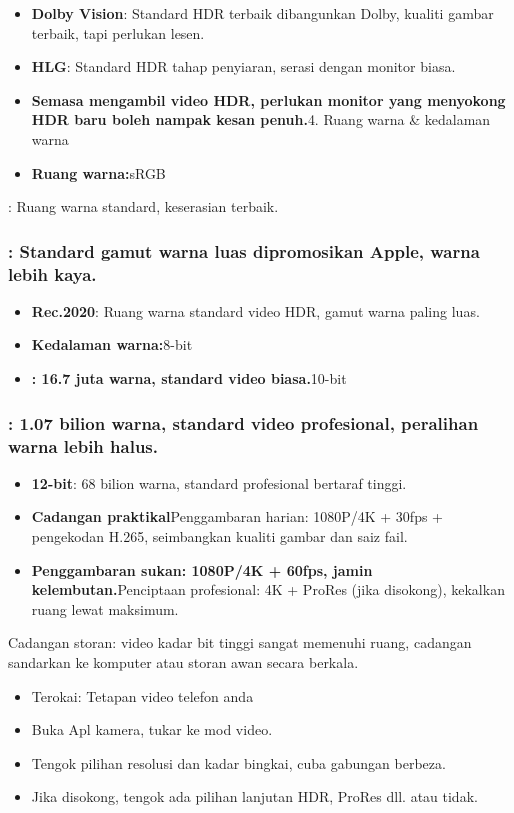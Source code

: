 \begin{itemize}
  \item \textbf{Dolby Vision}: Standard HDR terbaik dibangunkan Dolby, kualiti gambar terbaik, tapi perlukan lesen.
  \item \textbf{HLG}: Standard HDR tahap penyiaran, serasi dengan monitor biasa.
  \item \textbf{Semasa mengambil video HDR, perlukan monitor yang menyokong HDR baru boleh nampak kesan penuh.}4. Ruang warna \& kedalaman warna
  \item \textbf{Ruang warna:}sRGB
\end{itemize}

: Ruang warna standard, keserasian terbaik.


\subsubsection*{: Standard gamut warna luas dipromosikan Apple, warna lebih kaya.}

\begin{itemize}
  \item \textbf{Rec.2020}: Ruang warna standard video HDR, gamut warna paling luas.
  \item \textbf{Kedalaman warna:}8-bit
  \item \textbf{: 16.7 juta warna, standard video biasa.}10-bit
\end{itemize}

\subsubsection*{: 1.07 bilion warna, standard video profesional, peralihan warna lebih halus.}

\begin{itemize}
  \item \textbf{12-bit}: 68 bilion warna, standard profesional bertaraf tinggi.
  \item \textbf{Cadangan praktikal}Penggambaran harian: 1080P/4K + 30fps + pengekodan H.265, seimbangkan kualiti gambar dan saiz fail.
  \item \textbf{Penggambaran sukan: 1080P/4K + 60fps, jamin kelembutan.}Penciptaan profesional: 4K + ProRes (jika disokong), kekalkan ruang lewat maksimum.
\end{itemize}

\begin{tcbinfo}{Cadangan storan: video kadar bit tinggi sangat memenuhi ruang, cadangan sandarkan ke komputer atau storan awan secara berkala.}
\begin{itemize}
  \item Terokai: Tetapan video telefon anda
  \item Buka Apl kamera, tukar ke mod video.
  \item Tengok pilihan resolusi dan kadar bingkai, cuba gabungan berbeza.
  \item Jika disokong, tengok ada pilihan lanjutan HDR, ProRes dll. atau tidak.
\end{itemize}

\end{tcbinfo}

